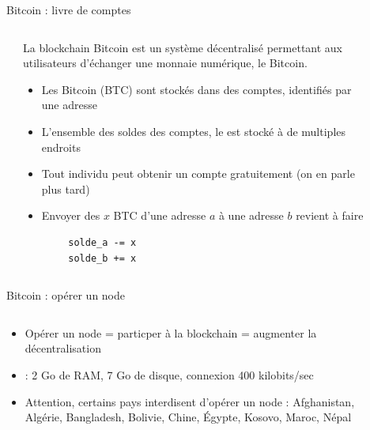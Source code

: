 \begin{frame}[fragile]{Bitcoin : livre de comptes}
  \begin{columns}
    \begin{column}{0.05\textwidth}
    \end{column}

    \begin{column}{0.65\textwidth}
      La blockchain Bitcoin est un système décentralisé permettant aux utilisateurs d'échanger une monnaie numérique, le Bitcoin.

      \begin{itemize}
        \item Les Bitcoin (BTC) sont stockés dans des comptes, identifiés par une adresse
        \item L'ensemble des soldes des comptes, le  est stocké à de multiples endroits
        \item Tout individu peut obtenir un compte gratuitement (on en parle plus tard)
        \item Envoyer des $x$ BTC d'une adresse $a$ à une adresse $b$ revient à faire
      \end{itemize}

      \begin{verbatim}
        solde_a -= x
        solde_b += x
      \end{verbatim}
    \end{column}

    \begin{column}{0.2\textwidth}
      
    \end{column}

    \begin{column}{0.1\textwidth}
    \end{column}
  \end{columns}
\end{frame}

\begin{frame}{Bitcoin : opérer un node}
  \begin{columns}
    \begin{column}{0.5\textwidth}
      \begin{itemize}
        \item Opérer un node = particper à la blockchain = augmenter la décentralisation
        \item {} : 2 Go de RAM, 7 Go de disque, connexion 400 kilobits/sec
        \item Attention, certains pays interdisent d'opérer un node : Afghanistan, Algérie, Bangladesh, Bolivie, Chine, Égypte, Kosovo, Maroc, Népal
      \end{itemize}
    \end{column}

    \begin{column}{0.5\textwidth}
      
    \end{column}
  \end{columns}
\end{frame}


